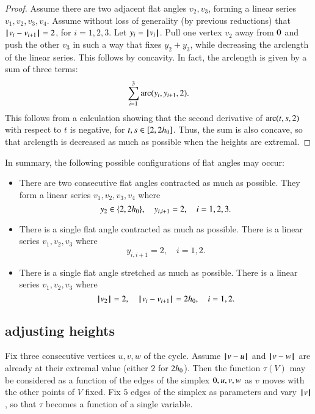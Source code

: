 \begin{proof}
Assume there are two adjacent flat angles $v_2,v_3$, forming a linear series $v_1,v_2,v_3,v_4$.
Assume without loss of generality (by previous reductions) that
%
${\hskip0.1em|\hskip-0.15em|\hskip0.1em}v_i - v_{i+1}{\hskip0.1em|\hskip-0.15em|\hskip0.1em}=2$, for $i=1,2,3$.
Let $y_i = {{\hskip0.1em|\hskip-0.15em|\hskip0.1em}v_i{\hskip0.1em|\hskip-0.15em|\hskip0.1em}}$.
Pull one vertex $v_2$ away from $0$ and push the other $v_3$ in such a way that fixes $y_2+y_3$, while decreasing the arclength of the linear series.  This follows by concavity.
In fact, the arclength is given by a sum of three terms:
  $$
  \sum_{i=1}^3\operatorname{arc}(y_i,y_{i+1},2).
  $$
This follows from a calculation showing that the second derivative of $\operatorname{arc}(t,s,2)$ with respect to $t$ is negative, for $t,s\in[2,2{h_0}]$.  Thus, the
sum is also concave, so that arclength is decreased as much as possible when the heights are extremal.
\end{proof}

In summary,  the following possible configurations of flat angles may occur:
\begin{itemize}
\item There are two consecutive flat angles contracted as much as possible.  They form a linear series $v_1,v_2,v_3,v_4$ where
$$
y_2\in\{2,2{h_0}\},\quad
y_{i,i+1}=2,\quad i=1,2,3.
$$
\item There is a single flat angle contracted as much as possible.  There
is a linear series $v_1,v_2,v_3$ where
$$
y_{i,i+1}=2,\quad i=1,2.
$$
\item There is a single flat angle stretched as much as possible.  There
is a linear series $v_1,v_2,v_3$ where
$$
{{\hskip0.1em|\hskip-0.15em|\hskip0.1em}v_2{\hskip0.1em|\hskip-0.15em|\hskip0.1em}}=2,\quad
{\hskip0.1em|\hskip-0.15em|\hskip0.1em}v_i - v_{i+1}{\hskip0.1em|\hskip-0.15em|\hskip0.1em}=2{h_0},\quad i=1,2.
$$
%
\end{itemize}


\subsection{adjusting heights}

Fix three consecutive vertices $u,v,w$ of the cycle.
%
%
%
Assume ${\hskip0.1em|\hskip-0.15em|\hskip0.1em}v - u{\hskip0.1em|\hskip-0.15em|\hskip0.1em}$ and ${\hskip0.1em|\hskip-0.15em|\hskip0.1em}v - w{\hskip0.1em|\hskip-0.15em|\hskip0.1em}$ are already at their extremal value (either $2$ for  $2{h_0}$).  Then the function $\tau(V)$ may be considered as a function
of the edges of the simplex $0,u,v,w$ as $v$ moves with the other points of $V$ fixed.  Fix $5$ edges of the simplex as parameters and vary ${{\hskip0.1em|\hskip-0.15em|\hskip0.1em}v{\hskip0.1em|\hskip-0.15em|\hskip0.1em}}$, so that $\tau$ becomes a function of a single variable.
%

